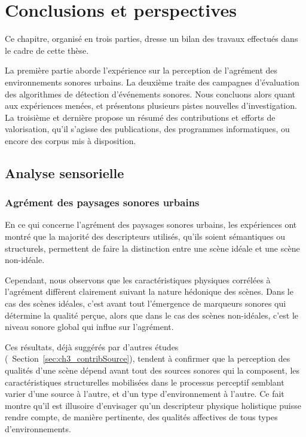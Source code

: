 \chapter{Conclusions et perspectives}\label{ch:end_conc}

Ce chapitre, organisé en trois parties, dresse un bilan des travaux effectués dans le cadre de cette thèse.

La première partie aborde l'expérience sur la perception de l'agrément des environnements sonores urbains. La deuxième traite des campagnes d'évaluation des algorithmes de détection d'événements sonores. Nous concluons alors quant aux expériences menées, et présentons plusieurs pistes nouvelles d'investigation. La troisième et dernière propose un résumé des contributions et efforts de valorisation, qu'il s'agisse des publications, des programmes informatiques, ou encore des corpus mis à disposition.

\section{Analyse sensorielle}

\subsection{Agrément des paysages sonores urbains}

En ce qui concerne l'agrément des paysages sonores urbains, les expériences ont montré que la majorité des descripteurs utilisés, qu'ils soient sémantiques ou structurels, permettent de faire la distinction entre une scène idéale et une scène non-idéale.

Cependant, nous observons que les caractéristiques physiques corrélées à l'agrément diffèrent clairement suivant la nature hédonique des scènes. Dans le cas des scènes idéales, c'est avant tout l'émergence de marqueurs sonores qui détermine la qualité perçue, alors que dans le cas des scènes non-idéales, c'est le niveau sonore global qui influe sur l'agrément.

Ces résultats, déjà suggérés par d'autres études (\cf~Section~\ref{sec:ch3_contribSource}), tendent à confirmer que la perception des qualités d'une scène dépend avant tout des sources sonores qui la composent, les caractéristiques structurelles mobilisées dans le processus perceptif semblant varier d'une source à l'autre, et d'un type d'environnement à l'autre. Ce fait montre qu'il est illusoire d'envisager qu'un descripteur physique holistique puisse rendre compte, de manière pertinente, des qualités affectives de tous types d'environnements.

